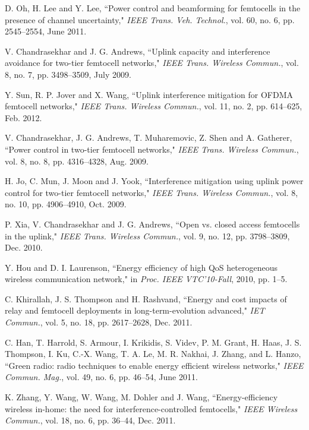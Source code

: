 \documentclass[10pt,final,journal,letterpaper,twoside,twocolumn]{IEEEtran}
\begin{document}
\begin{thebibliography}{1}
D. Oh, H. Lee and Y. Lee, ``Power control and beamforming for femtocells in
the presence of channel uncertainty," {\em IEEE Trans. Veh. Technol.}, vol.
60, no. 6, pp. 2545--2554, June 2011.

V. Chandrasekhar and J. G. Andrews, ``Uplink capacity and interference
avoidance for two-tier femtocell networks," {\em IEEE Trans. Wireless
Commun.}, vol. 8, no. 7, pp. 3498--3509, July 2009.

Y. Sun, R. P. Jover and X. Wang, ``Uplink interference mitigation for OFDMA
femtocell networks," {\em IEEE Trans. Wireless Commun.}, vol. 11, no. 2, pp.
614--625, Feb. 2012.

V. Chandrasekhar, J. G. Andrews, T. Muharemovic, Z. Shen and A. Gatherer, ``Power control in two-tier femtocell networks," {\em IEEE Trans. Wireless
Commun.}, vol. 8, no. 8, pp. 4316--4328, Aug. 2009.



    H. Jo, C. Mun, J. Moon and J. Yook, ``Interference mitigation using uplink power control for two-tier femtocell networks," {\em IEEE Trans. Wireless Commun.}, vol. 8, no. 10, pp. 4906--4910, Oct. 2009.

    P. Xia, V. Chandrasekhar and J. G. Andrews, ``Open vs. closed access femtocells in the uplink," {\em IEEE Trans. Wireless Commun.}, vol. 9, no. 12, pp. 3798--3809, Dec. 2010.

    Y. Hou and D. I. Laurenson, ``Energy efficiency of high QoS heterogeneous wireless communication network," in {\em Proc. IEEE VTC'10-Fall}, 2010, pp. 1--5.

    C. Khirallah, J. S. Thompson and H. Rashvand, ``Energy and cost impacts of relay and femtocell deployments in long-term-evolution advanced," {\em IET Commun.}, vol. 5, no. 18, pp. 2617--2628, Dec. 2011.

    C. Han, T. Harrold, S. Armour, I. Krikidis, S. Videv, P. M. Grant, H. Haas, J. S. Thompson, I. Ku, C.-X. Wang, T. A. Le, M. R. Nakhai, J. Zhang, and L. Hanzo, ``Green radio: radio techniques to enable energy efficient wireless networks," {\em IEEE Commun. Mag.}, vol. 49, no. 6, pp. 46--54, June 2011.

    K. Zhang, Y. Wang, W. Wang, M. Dohler and J. Wang, ``Energy-efficiency wireless in-home: the need for interference-controlled femtocells," {\em IEEE Wireless Commun.}, vol. 18, no. 6, pp. 36--44, Dec. 2011.


\end{thebibliography}
\end{document}
